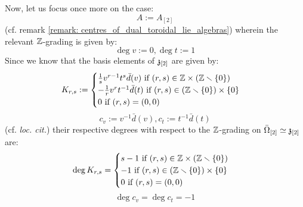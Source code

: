 \begin{remark}
            Now, let us focus once more on the case:
                $$A := A_{[2]}$$
            (cf. remark \ref{remark: centres_of_dual_toroidal_lie_algebras}) wherein the relevant $\mathbb{Z}$-grading is given by:
                $$\deg v := 0, \deg t := 1$$
            Since we know that the basis elements of $\mathfrak{z}_{[2]}$ are given by:
                $$
                    K_{r, s} :=
                    \begin{cases}
                        \text{$\frac1s v^{r - 1} t^s \bar{d}(v)$ if $(r, s) \in \Z \x (\Z \setminus \{0\})$}
                        \\
                        \text{$-\frac1r v^r t^{-1} \bar{d}(t)$ if $(r, s) \in (\Z \setminus \{0\}) \x \{0\}$}
                        \\
                        \text{$0$ if $(r, s) = (0, 0)$}
                    \end{cases}
                $$
                $$c_v := v^{-1} \bar{d}(v), c_t := t^{-1} \bar{d}(t)$$
            (cf. \textit{loc. cit.}) their respective degrees with respect to the $\mathbb{Z}$-grading on $\bar{\Omega}_{[2]} \simeq \mathfrak{z}_{[2]}$ are:
                $$
                    \deg K_{r, s} =
                    \begin{cases}
                        \text{$s - 1$ if $(r, s) \in \Z \x (\Z \setminus \{0\})$}
                        \\
                        \text{$-1$ if $(r, s) \in (\Z \setminus \{0\}) \x \{0\}$}
                        \\
                        \text{$0$ if $(r, s) = (0, 0)$}
                    \end{cases}
                $$
                $$\deg c_v = \deg c_t = -1$$
        \end{remark}

